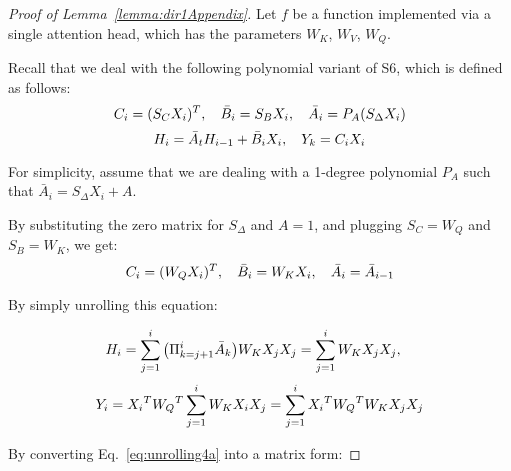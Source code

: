 \begin{proof}[Proof of Lemma~\ref{lemma:dir1Appendix}]\quad 
Let $f$ be a function implemented via a single attention head, which has the parameters $W_K$, $W_V$, $W_Q$.


Recall that we deal with the following polynomial variant of S6, which is defined as follows:
\begin{equation}\label{eq:simplifiedModelAPPEND}
\small
    C_i = ( {S_C}X_i )^T, \quad \bar{B}_i = S_B X_i, \quad \bar{A}_i = P_A ( S_\Delta X_i )%
\end{equation}
\begin{equation}
\small
     H_{i} =  \bar{A}_t H_{i-1} + \bar{B}_i X_i, \quad Y_k = C_i X_i
\end{equation}

For simplicity, assume that we are dealing with a 1-degree polynomial $P_A$ such that $  \bar{A}_i = S_\Delta X_i + A $. 

By substituting the zero matrix for $S_\Delta$ and $A=1$, and plugging $S_C = W_Q$ and $S_B = W_K$, we get:
\begin{equation}
\small
    C_i = (W_Q X_i)^T, \quad \bar{B}_i = W_K X_i, \quad \bar{A}_i = \bar{A}_{i-1}
\end{equation}

By simply unrolling this equation:

\begin{equation} \label{eq:unrolling3a}
\small
 H_{i} = \sum_{j=1}^i \big{(} \Pi_{k=j+1}^i \bar{A}_k \big{)} W_K X_{j} X_j = \sum_{j=1}^i W_K X_{j} X_j, \quad %
 \end{equation}
\begin{equation} \label{eq:unrolling4a}
\small
 Y_{i} =  {X_i}^T {W_Q}^T \sum_{j=1}^i W_K X_{i} X_j =  \sum_{j=1}^i {X_i}^T {W_Q}^T W_K X_{j} X_j
\end{equation}



By converting Eq.~\ref{eq:unrolling4a} into a matrix form:


\end{proof}
